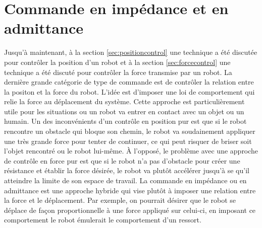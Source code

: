 \section{Commande en impédance et en admittance}
\label{sec:impcontrol}

Jusqu'à maintenant, à la section \ref{sec:positioncontrol} une technique a été discutée pour contrôler la position d'un robot et à la section \ref{sec:forcecontrol} une technique a été discuté pour contrôler la force transmise par un robot. La dernière grande catégorie de type de commande est de contrôler la relation entre la positon et la force du robot. L'idée est d'imposer une loi de comportement qui relie la force au déplacement du système. Cette approche est particulièrement utile pour les situations ou un robot va entrer en contact avec un objet ou un humain. Un des inconvénients d'un contrôle en position pur est que si le robot rencontre un obstacle qui bloque son chemin, le robot va soudainement appliquer une très grande force pour tenter de continuer, ce qui peut risquer de briser soit l'objet rencontré ou le robot lui-même. À l'opposé, le problème avec une approche de contrôle en force pur est que si le robot n'a pas d'obstacle pour créer une résistance et établir la force désirée, le robot va plutôt accélérer jusqu'à se qu'il atteindre la limite de son espace de travail. La commande en impédance ou en admittance est une approche hybride qui vise plutôt à imposer une relation entre la force et le déplacement. Par exemple, on pourrait désirer que le robot se déplace de façon proportionnelle à une force appliqué sur celui-ci, en imposant ce comportement le robot émulerait le comportement d'un ressort. 


